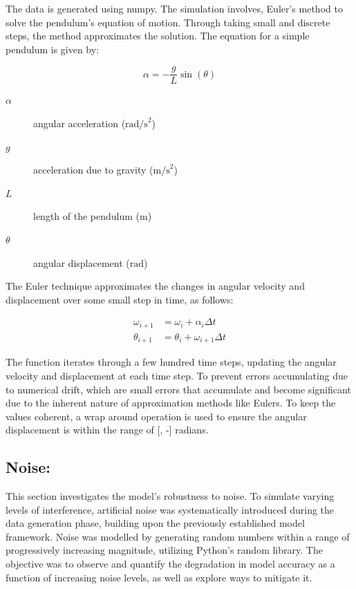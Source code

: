 \documentclass{article}
\begin{document}
The data is generated using numpy. The simulation involves, Euler's method to solve the pendulum's equation of motion. Through taking small and discrete steps, the method approximates the solution. The equation for a simple pendulum is given by: \\

\begin{center}
\begin{equation}
\alpha = -\frac{g}{L} \sin(\theta)
\end{equation}
\end{center}

\begin{description}
    \item[\(\alpha\)] angular acceleration (\(\text{rad/s}^2\))
    \item[\(g\)] acceleration due to gravity (\(\text{m/s}^2\))
    \item[\(L\)] length of the pendulum (\(\text{m}\))
    \item[\(\theta\)] angular displacement (\(\text{rad}\))
\end{description}

The Euler technique approximates the changes in angular velocity and displacement over some small step in time, as follows:\\

\begin{center}
\begin{align} 
\omega_{i+1} &= \omega_i + \alpha_i \Delta t \\
\theta_{i+1} &= \theta_i + \omega_{i+1} \Delta t 
\end{align}
\end{center}


The function iterates through a few hundred time steps, updating the angular velocity and displacement at each time step. To prevent errors accumulating due to numerical drift, which are small errors that accumulate and become significant due to the inherent nature of approximation methods like Eulers. To keep the values coherent, a wrap around operation is used to ensure the angular displacement is within the range of [\pi, -\pi] radians.\\ 

\subsection{Noise: }

    This section investigates the model's robustness to noise. To simulate varying levels of interference, artificial noise was systematically introduced during the data generation phase, building upon the previously established model framework. Noise was modelled by generating random numbers within a range of progressively increasing magnitude, utilizing Python's random library. The objective was to observe and quantify the degradation in model accuracy as a function of increasing noise levels, as well as explore ways to mitigate it.\\
\end{document}
